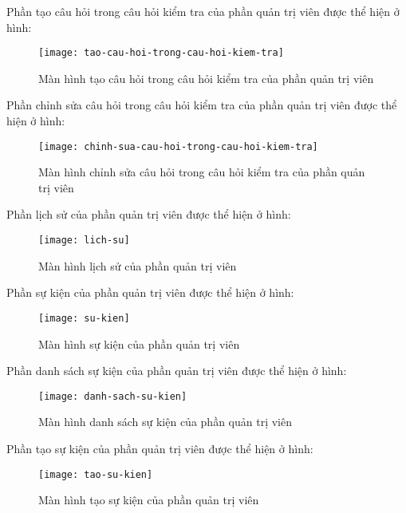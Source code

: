 \documentclass[../Thesis.tex]{subfiles}
\begin{document}
        Phần tạo câu hỏi trong câu hỏi kiểm tra của phần quản trị viên được thể hiện ở hình:
        \begin{figure}[ht!]
            \centering\texttt{[image: tao-cau-hoi-trong-cau-hoi-kiem-tra]}
            \caption{Màn hình tạo câu hỏi trong câu hỏi kiểm tra của phần quản trị viên}
            \label{fig:tao-cau-hoi-trong-cau-hoi-kiem-tra}
        \end{figure}

        Phần chỉnh sửa câu hỏi trong câu hỏi kiểm tra của phần quản trị viên được thể hiện ở hình:
        \begin{figure}[ht!]
            \centering\texttt{[image: chinh-sua-cau-hoi-trong-cau-hoi-kiem-tra]}
            \caption{Màn hình chỉnh sửa câu hỏi trong câu hỏi kiểm tra của phần quản trị viên}
            \label{fig:chinh-sua-cau-hoi-trong-cau-hoi-kiem-tra}
        \end{figure}

        Phần lịch sử của phần quản trị viên được thể hiện ở hình:
        \begin{figure}[ht!]
            \centering\texttt{[image: lich-su]}
            \caption{Màn hình lịch sử của phần quản trị viên}
            \label{fig:lich-su}
        \end{figure}

        Phần sự kiện của phần quản trị viên được thể hiện ở hình:
        \begin{figure}[ht!]
            \centering\texttt{[image: su-kien]}
            \caption{Màn hình sự kiện của phần quản trị viên}
            \label{fig:su-kien}
        \end{figure}

        Phần danh sách sự kiện của phần quản trị viên được thể hiện ở hình:
        \begin{figure}[ht!]
            \centering\texttt{[image: danh-sach-su-kien]}
            \caption{Màn hình danh sách sự kiện của phần quản trị viên}
            \label{fig:danh-sach-su-kien}
        \end{figure}

        Phần tạo sự kiện của phần quản trị viên được thể hiện ở hình:
        \begin{figure}[ht!]
            \centering\texttt{[image: tao-su-kien]}
            \caption{Màn hình tạo sự kiện của phần quản trị viên}
            \label{fig:tao-su-kien}
        \end{figure}
\end{document}
